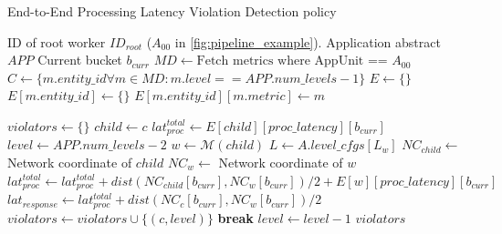 \begin{algorithm}
\caption{End-to-End Processing Latency Violation Detection policy}
\label{algo:oneedge_violation_detection}
\begin{algorithmic}[1]
\Require ID of root worker $ID_{root}$ ($A_{00}$ in \cref{fig:pipeline_example}).
\Require Application abstract $APP$
\Require Current bucket $b_{curr}$
\State $MD \gets \text{Fetch metrics where AppUnit == }A_{00}$
\State $C \gets \{ m.entity\_id \forall m \in MD : m.level == APP.num\_levels-1 \}$
\State $E \gets \{\}$ 
        \State $E[m.entity\_id] \gets \{\}$
    \EndIf
    \State $E[m.entity\_id][m.metric] \gets m$ 
\EndFor

\State $violators \gets \{\}$
    \State $child \gets c$  
    \State $lat_{proc}^{total} \gets E[child][proc\_latency][b_{curr}]$
    \State $level \gets APP.num\_levels-2$ 
     
        \State $w \gets \mathcal{M} \left( child \right)$
        \State $L \gets A.level\_cfgs [L_w]$
        \State $NC_{child} \gets $ Network coordinate of $child$ 
        \State $NC_{w} \gets $ Network coordinate of $w$
        \State $lat_{proc}^{total} \gets lat_{proc}^{total} + dist \left( NC_{child}[b_{curr}], NC_w[b_{curr}] \right)/2 + E[w][proc\_latency][b_{curr}]$
        \State $lat_{response} \gets lat_{proc}^{total} + dist \left( NC_{c}[b_{curr}], NC_w[b_{curr}] \right)/2$
            \State $violators \gets violators \cup \{ \left( c, level \right) \}$
            \State \textbf{break}
        \EndIf
        \State $level \gets level - 1$
    \EndWhile
\EndFor
\Return $violators$
\end{algorithmic}
\end{algorithm}

